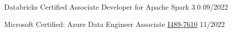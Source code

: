 
\begin{cvhonors}

	\cvhonor
	{Databricks Certified Associate Developer for Apache Spark 3.0}
	{\href{https://credentials.databricks.com/46ebd6b9-974a-4ecc-9cba-c69cc89deaa2}{\faLink{}}}
	{}
	{09/2022}

	\cvhonor
	{Microsoft Certified: Azure Data Engineer Associate}
	{\href{https://www.credly.com/badges/a20158bd-d8a5-43fd-9b98-c32b26fd9dee}{\faLink\acvHeaderIconSep I489-7610}}
	{}
	{11/2022}

\end{cvhonors}